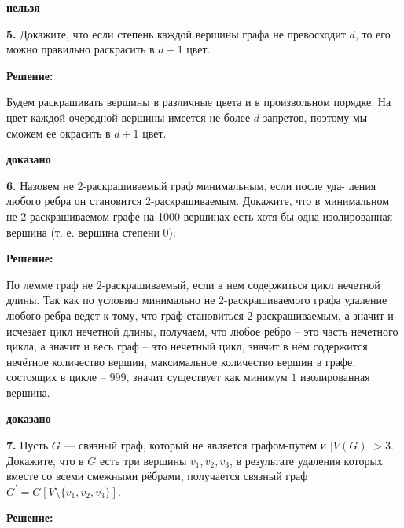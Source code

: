 \documentclass[a4paper,12pt]{article} %
\begin{document}
\begin{flushright}
\begin{large}
\textbf {нельзя }
\end{large}
\end{flushright}

{\bf 5.} Докажите, что если степень каждой вершины графа не превосходит
$d$, то его можно правильно раскрасить в $d + 1$ цвет.
\begin{center}
\bfseries
{\Large Решение: }
\end{center}

Будем раскрашивать вершины в различные цвета и в произвольном порядке.
На цвет каждой очередной вершины имеется не более $d$ запретов, поэтому
мы сможем ее окрасить в $d+1$ цвет.\\

\begin{flushright}
\begin{large}
\textbf {доказано}
\end{large}
\end{flushright}

{\bf 6.} Назовем не 2-раскрашиваемый граф минимальным, если после уда-
ления любого ребра он становится 2-раскрашиваемым. Докажите, что
в минимальном не 2-раскрашиваемом графе на 1000 вершинах есть
хотя бы одна изолированная вершина (т. е. вершина степени 0).
\begin{center}
\bfseries
{\Large Решение: }
\end{center}

По лемме граф не $2$-раскрашиваемый, если в нем содержиться цикл нечетной длины. Так как по условию минимально не 2-раскрашиваемого графа удаление любого ребра ведет к тому, что граф становиться 2-раскрашиваемым, а значит и исчезает цикл нечетной длины, получаем, что любое ребро -- это часть нечетного цикла, а значит и весь граф -- это нечетный цикл, значит в нём содержится нечётное количество вершин, максимальное количество вершин в графе, состоящих в цикле -- $999$, значит существует как минимум $1$ изолированная вершина.\\ 

\begin{flushright}
\begin{large}
\textbf {доказано }
\end{large}
\end{flushright}

{\bf 7.} Пусть $G$ — связный граф, который не является графом-путём и
$|V (G)| > 3$. Докажите, что в $G$ есть три вершины $v_1, v_2, v_3$, в результате
удаления которых вместе со всеми смежными рёбрами, получается
связный граф $G^{\textbf{'}} = G [V \setminus \{v_1,v_2,v_3 \} ]$.
\begin{center}
\bfseries
{\Large Решение: }
\end{center}
\end{document}
